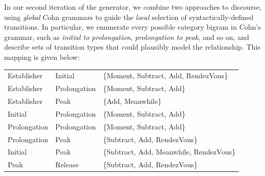 In our second iteration of the generator, we combine two
approaches to discourse, using {\em global} Cohn grammars to guide the {\em
local} selection of syntactically-defined transitions.
%
%
In particular, we enumerate every possible category bigram in Cohn's grammar,
such as {\em initial to prolongation}, {\em prolongation to peak}, and so
on, and describe sets of transition types that could plausibly model the
relationship. This mapping is given below:



{\scriptsize
\begin{tabular}{lll}
Establisher & Initial & \{Moment, Subtract, Add, RendezVous\} \\
   Establisher & Prolongation & \{Moment, Subtract, Add\} \\
   Establisher & Peak & \{Add, Meanwhile\} \\
   Initial & Prolongation & \{Moment, Subtract, Add\} \\
   Prolongation & Prolongation & \{Moment, Subtract, Add\} \\
   Prolongation & Peak & \{Subtract, Add, RendezVous\} \\
   Initial & Peak & \{Subtract, Add, Meanwhile, RendezVous\} \\
   Peak & Release & \{Subtract, Add, RendezVous\}
\end{tabular}
}

